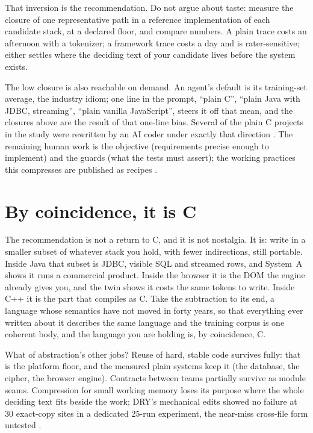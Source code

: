 \documentclass[journal]{IEEEtran}
\begin{document}
That inversion is the recommendation. Do not argue about taste: measure
the closure of one representative path in a reference implementation of
each candidate stack, at a declared floor, and compare numbers. A plain
trace costs an afternoon with a tokenizer; a framework trace costs a
day and is rater-sensitive; either settles where the deciding text of
your candidate lives before the system exists.

The low closure is also reachable on demand. An agent's default is its
training-set average, the industry idiom; one line in the prompt,
``plain C'', ``plain Java with JDBC, streaming'', ``plain vanilla
JavaScript'', steers it off that mean, and the closures above are the
result of that one-line bias. Several of the plain C projects in the
study were rewritten by an AI coder under exactly that direction
\cite{full}. The remaining human work is the objective (requirements
precise enough to implement) and the guards (what the tests must
assert); the working practices this compresses are published as recipes
\cite{recipes}.

\section*{By coincidence, it is C}

The recommendation is not a return to C, and it is not nostalgia. It
is: write in a smaller subset of whatever stack you hold, with fewer
indirections, still portable. Inside Java that subset is JDBC, visible
SQL and streamed rows, and System~A shows it runs a commercial product.
Inside the browser it is the DOM the engine already gives you, and the
twin shows it costs the same tokens to write. Inside C++ it is the part
that compiles as C. Take the subtraction to its end, a language whose
semantics have not moved in forty years, so that everything ever
written about it describes the same language and the training corpus is
one coherent body, and the language you are holding is, by coincidence,
C.

What of abstraction's other jobs? Reuse of hard, stable code survives
fully: that is the platform floor, and the measured plain systems keep
it (the database, the cipher, the browser engine). Contracts between
teams partially survive as module seams. Compression for small working
memory loses its purpose where the whole deciding text fits beside the
work; DRY's mechanical edits showed no failure at 30 exact-copy sites
in a dedicated 25-run experiment, the near-miss cross-file form
untested \cite{full}.
\end{document}
